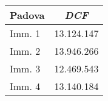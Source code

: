 \begin{tabular}[c]{|l||c|}
\hline
{\bfseries Padova} & {\bfseries \textit{DCF}} \\
\hline \hline
Imm. 1 & 13.124.147 \\
\hline
Imm. 2 & 13.946.266 \\
\hline
Imm. 3 & 12.469.543 \\
\hline
Imm. 4 & 13.140.184 \\
\hline
\end{tabular} 